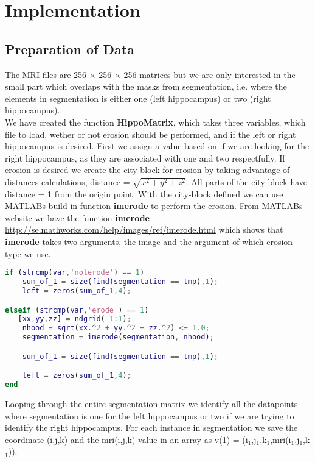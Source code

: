 \chapter{Implementation}

\section{Preparation of Data}
The MRI files are 256 $\times$ 256 $\times$ 256 matrices but we are only interested in the small part which overlaps with the masks from segmentation, i.e. where the elements in segmentation is either one (left hippocampus) or two (right hippocampus).\\
We have created the function \textbf{HippoMatrix}, which takes three variables, which file to load, wether or not erosion should be performed, and if the left or right hippocampus is desired.
First we assign a value based on if we are looking for the right hippocampus, as they are associated with one and two respectfully.
If erosion is desired we create the city-block for erosion by taking advantage of distances calculations, distance = $\sqrt{x^2+y^2+z^2}$. All parts of the city-block have distance = 1 from the origin point. With the city-block defined we can use MATLABs build in function \textbf{imerode} to perform the erosion. From MATLABs website we have the function \textbf{imerode} \href{http://se.mathworks.com/help/images/ref/imerode.html}{http://se.mathworks.com/help/images/ref/imerode.html} which shows that \textbf{imerode} takes two arguments, the image and the argument of which erosion type we use.

\begin{lstlisting}[language=Matlab]
if (strcmp(var,'noterode') == 1)
    sum_of_1 = size(find(segmentation == tmp),1);
    left = zeros(sum_of_1,4);

elseif (strcmp(var,'erode') == 1)
   [xx,yy,zz] = ndgrid(-1:1);
    nhood = sqrt(xx.^2 + yy.^2 + zz.^2) <= 1.0;
    segmentation = imerode(segmentation, nhood);

    sum_of_1 = size(find(segmentation == tmp),1);

    left = zeros(sum_of_1,4);
end
\end{lstlisting}

Looping through the entire segmentation matrix we identify all the datapoints where segmentation is one for the left hippocampus or two if we are trying to identify the right hippocampus. For each instance in segmentation we save the coordinate (i,j,k) and the mri(i,j,k) value in an array as v(1) = (i$_1$,j$_1$,k$_1$,mri(i$_1$,j$_1$,k$_1$)).

